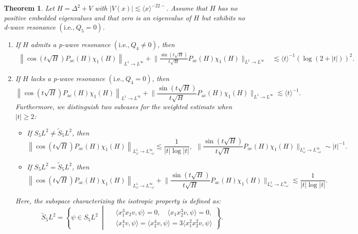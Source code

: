 \documentclass[reqno]{amsart}
\newtheorem{theorem}{Theorem}[section]
\numberwithin{equation}{section}
\begin{document}
\begin{theorem}\label{main_theorem_low_32}
	Let $H = \Delta^2 + V$ with $|V(x)| \lesssim \langle x \rangle^{-22-}$.  
	Assume that $H$ has no positive embedded eigenvalues and that zero is an eigenvalue of $H$ but exhibits no d-wave resonance $(\text{i.e.,}\  Q_5 = 0 )$.
	\begin{enumerate}  
		\item If $H$ admits a p-wave resonance $(\text{i.e.,}\  Q_4 \neq 0 )$, then 
		$$  
		\begin{aligned}  
		\left\|\cos (t \sqrt{H}) P_{\mathrm{ac}}(H)\chi_1(H)\right\|_{L^1 \to L^{\infty}} + 
		\bigg\|\frac{\sin (t \sqrt{H})}{t\sqrt{H}} P_{\mathrm{ac}}(H)\chi_1(H)\bigg\|_{L^1 \to L^{\infty}} &\lesssim\langle t \rangle^{-1} {(\log (2+|t|))^2}.  
		\end{aligned}  
		$$  
		\item If $H$ lacks a p-wave resonance $(\text{i.e.,}\  Q_4 = 0 )$, then  
		\begin{equation*}  
		\left\|\cos(t\sqrt{H}) P_{\mathrm{ac}}(H)\chi_1(H)\right\|_{L^1 \to L^\infty} +  \bigg\|\frac{\sin(t\sqrt{H})}{t\sqrt{H}} P_{\mathrm{ac}}(H)\chi_1(H)\bigg\|_{L^1 \to L^\infty} \lesssim \langle t\rangle^{-1}.  
		\end{equation*}  
		Furthermore, we distinguish two subcases for the weighted estimate when $|t| \ge 2$:  
		\begin{itemize}  
			\item If ${S}_5L^2\neq\widetilde{S}_5L^2 $, then   
			\[   \left \|\cos (t \sqrt{H}) P_{\mathrm{ac}}(H)\chi_1(H)\right\|_{L^1_\omega\to L^\infty_{-\omega}} \lesssim\frac{1}{|t|\log |t|},\  \ \bigg\|\frac{\sin (t \sqrt{H})}{t\sqrt{H}} P_{\mathrm{ac}}(H)\chi_1(H)\bigg\|_{L^1_\omega\to L^\infty_{-\omega}}\sim|t|^{-1}.  
			\]  
			\item If ${S}_5L^2=\widetilde{S}_5L^2 $, then
			\[ 
			\left\|\cos (t \sqrt{H}) P_{\mathrm{ac}}(H)\chi_1(H)\right\|_{L^1_\omega \to L^{\infty}_{-\omega}} +  
			\bigg\|\frac{\sin (t \sqrt{H})}{t\sqrt{H}} P_{\mathrm{ac}}(H)\chi_1(H)\bigg\|_{L^1_\omega \to L^{\infty}_{-\omega}} \lesssim \frac{1}{|t| \log|t|}.  
			\] 
            \end{itemize}
		Here, the subspace characterizing the isotropic property is defined as:  
		\begin{equation} \label{S5wide}   
		\widetilde{S}_5L^2 = \left\{ \psi \in S_5 L^2 \;\middle|\;     
		\begin{aligned}    
		&\langle x_1^3 x_2 v, \psi \rangle = 0, \quad \langle x_1 x_2^3 v, \psi \rangle = 0, \\  
		&\langle x_1^4 v, \psi \rangle = \langle x_2^4 v, \psi \rangle = 3 \langle x_1^2 x_2^2 v, \psi \rangle    
		\end{aligned}    
		\right\}.    
		\end{equation}  
	\end{enumerate}  
\end{theorem}  
\end{document}
